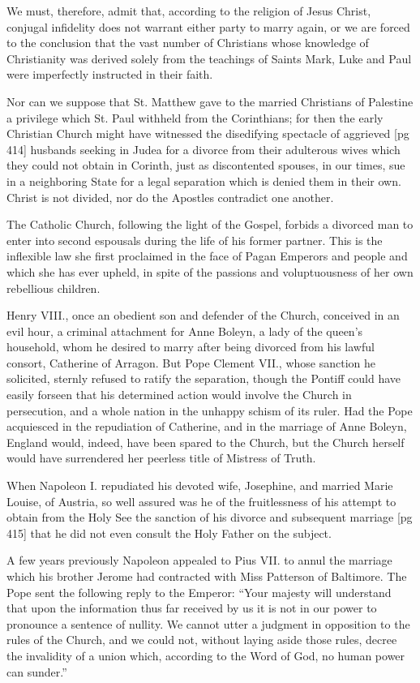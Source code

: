 We must, therefore, admit that, according to
the religion of Jesus Christ, conjugal infidelity
does not warrant either party to marry again,
or we are forced to the conclusion that the vast
number of Christians whose knowledge of Christianity
was derived solely from the teachings of
Saints Mark, Luke and Paul were imperfectly
instructed in their faith.

Nor can we suppose that St. Matthew gave to
the married Christians of Palestine a privilege
which St. Paul withheld from the Corinthians;
for then the early Christian Church might have
witnessed the disedifying spectacle of aggrieved
[pg 414]
husbands seeking in Judea for a divorce from
their adulterous wives which they could not obtain
in Corinth, just as discontented spouses, in
our times, sue in a neighboring State for a legal
separation which is denied them in their own.
Christ is not divided, nor do the Apostles contradict
one another.

The Catholic Church, following the light of the
Gospel, forbids a divorced man to enter into second
espousals during the life of his former partner.
This is the inflexible law she first proclaimed
in the face of Pagan Emperors and people
and which she has ever upheld, in spite of
the passions and voluptuousness of her own rebellious
children.

Henry VIII., once an obedient son and defender
of the Church, conceived in an evil hour, a criminal
attachment for Anne Boleyn, a lady of the
queen's household, whom he desired to marry
after being divorced from his lawful consort,
Catherine of Arragon. But Pope Clement VII.,
whose sanction he solicited, sternly refused to
ratify the separation, though the Pontiff could
have easily forseen that his determined action
would involve the Church in persecution, and a
whole nation in the unhappy schism of its ruler.
Had the Pope acquiesced in the repudiation of
Catherine, and in the marriage of Anne Boleyn,
England would, indeed, have been spared to the
Church, but the Church herself would have surrendered
her peerless title of Mistress of Truth.

When Napoleon I. repudiated his devoted wife,
Josephine, and married Marie Louise, of Austria,
so well assured was he of the fruitlessness
of his attempt to obtain from the Holy See the
sanction of his divorce and subsequent marriage
[pg 415]
that he did not even consult the Holy Father on
the subject.

A few years previously Napoleon appealed to
Pius VII. to annul the marriage which his
brother Jerome had contracted with Miss Patterson
of Baltimore. The Pope sent the following
reply to the Emperor: “Your majesty will
understand that upon the information thus far
received by us it is not in our power to pronounce
a sentence of nullity. We cannot utter a
judgment in opposition to the rules of the Church,
and we could not, without laying aside those rules,
decree the invalidity of a union which, according
to the Word of God, no human power can sunder.”

